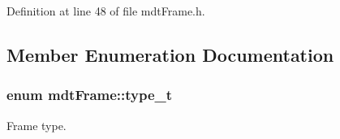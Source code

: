 Definition at line 48 of file mdt\-Frame.\-h.



\subsection{Member Enumeration Documentation}
\hypertarget{classmdt_frame_af936e37d5fe4c066c0fb0161fafd4a17}{
\subsubsection[{type\-\_\-t}]{\setlength{\rightskip}{0pt plus 5cm}enum {\bf mdt\-Frame\-::type\-\_\-t}}}\label{classmdt_frame_af936e37d5fe4c066c0fb0161fafd4a17}


Frame type. 

